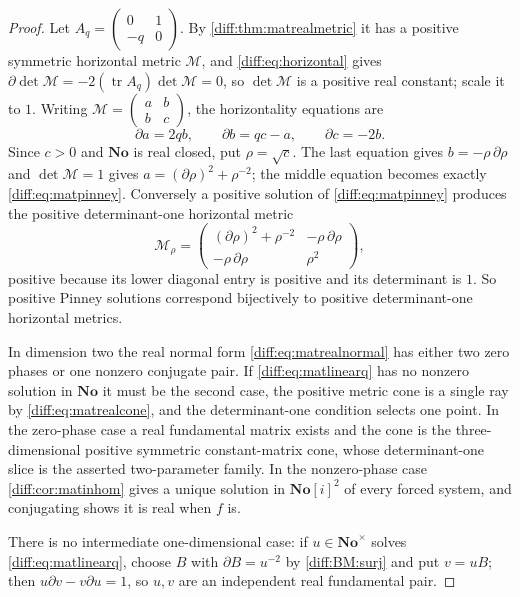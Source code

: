 \documentclass[11pt,letterpaper]{article}
\numberwithin{equation}{section}
\theoremstyle{definition}
\theoremstyle{remark}
\newcommand{\No}{\mathbf{No}}
\newcommand{\SC}{\mathbf{No}[i]}
\newcommand{\der}{\partial}
\newcommand{\tr}{\operatorname{tr}}
\begin{document}
\begin{proof}
Let $A_{q}=\left(\begin{smallmatrix}0&1\\-q&0\end{smallmatrix}\right)$. By
\cref{diff:thm:matrealmetric} it has a positive symmetric horizontal metric
$\mathcal M$, and \cref{diff:eq:horizontal} gives
$\der\det\mathcal M=-2(\tr A_{q})\det\mathcal M=0$, so $\det\mathcal M$ is a
positive real constant; scale it to $1$. Writing
$\mathcal M=\left(\begin{smallmatrix}a&b\\b&c\end{smallmatrix}\right)$, the
horizontality equations are
\begin{equation}\label{diff:eq:matmetriccomponents}
 \der a=2qb,\qquad \der b=qc-a,\qquad \der c=-2b .
\end{equation}
Since $c>0$ and $\No$ is real closed, put $\rho=\sqrt c$. The last equation
gives $b=-\rho\,\der\rho$ and $\det\mathcal M=1$ gives
$a=(\der\rho)^{2}+\rho^{-2}$; the middle equation becomes exactly
\cref{diff:eq:matpinney}. Conversely a positive solution of
\cref{diff:eq:matpinney} produces the positive determinant-one horizontal
metric
\begin{equation}\label{diff:eq:matpinneymetric}
 \mathcal M_{\rho}=
 \begin{pmatrix}
 (\der\rho)^{2}+\rho^{-2} & -\rho\,\der\rho\\
 -\rho\,\der\rho & \rho^{2}
 \end{pmatrix},
\end{equation}
positive because its lower diagonal entry is positive and its determinant is
$1$. So positive Pinney solutions correspond bijectively to positive
determinant-one horizontal metrics.

In dimension two the real normal form \cref{diff:eq:matrealnormal} has either
two zero phases or one nonzero conjugate pair. If \cref{diff:eq:matlinearq}
has no nonzero solution in $\No$ it must be the second case, the positive
metric cone is a single ray by \cref{diff:eq:matrealcone}, and the
determinant-one condition selects one point. In the zero-phase case a real
fundamental matrix exists and the cone is the three-dimensional positive
symmetric constant-matrix cone, whose determinant-one slice is the asserted
two-parameter family. In the nonzero-phase case \cref{diff:cor:matinhom} gives
a unique solution in $\SC^{2}$ of every forced system, and conjugating shows
it is real when $f$ is.

There is no intermediate one-dimensional case: if $u\in\No^{\times}$ solves
\cref{diff:eq:matlinearq}, choose $B$ with $\der B=u^{-2}$ by
\ref{diff:BM:surj} and put $v=uB$; then $u\der v-v\der u=1$, so $u,v$ are an
independent real fundamental pair.
\end{proof}
\end{document}
